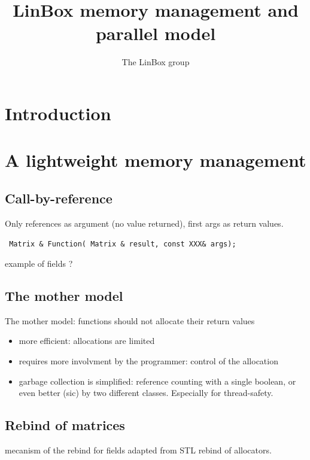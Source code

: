 \documentclass[runningheads,a4paper]{llncs}
\newcommand{\linboxsp}{{\sc LinBox}\xspace}
\begin{document}
\mainmatter  
\title{\linboxsp memory management and parallel model}
\author{The \linboxsp group}
\maketitle

\section{Introduction}


\section{A lightweight memory management}

\subsection{Call-by-reference}

Only references as argument (no value returned), first args as return
values.

\verb! Matrix & Function( Matrix & result, const XXX& args); !

example of fields \cite[\S 2.1]{jgd:2002:icms} ?

\subsection{The mother model}


The mother model: functions should not allocate their return values

\begin{itemize}
\item more efficient: allocations are limited

\item requires more involvment by the programmer: control of the allocation

\item garbage collection is simplified: reference counting with a single
boolean, or even better (sic) by two different classes.
Especially for thread-safety.
\end{itemize}


\subsection{Rebind of matrices}

mecanism of the rebind for fields adapted from STL rebind of
allocators.
\end{document}
